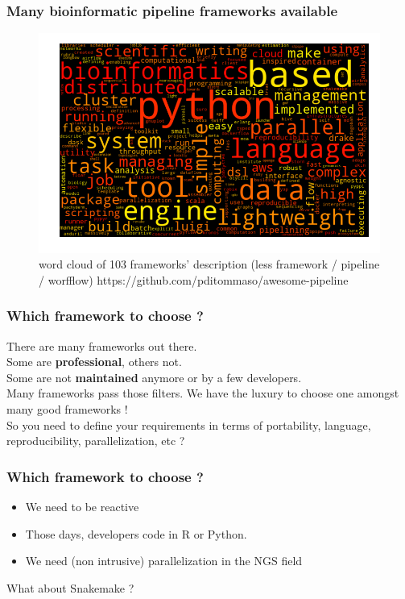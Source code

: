 \documentclass{beamer}
\begin{document}
\begin{frame}
\frametitle{Many bioinformatic pipeline frameworks available}
\centering
 \begin{figure}
 \includegraphics[scale=0.4]{images/cloud.png}
 \caption{word cloud of 103 
frameworks' description (less 
framework / pipeline / worfflow) https://github.com/pditommaso/awesome-pipeline}
 \end{figure}
 \end{frame}


\begin{frame}
 \frametitle{Which framework to choose ?}
 
 There are many frameworks out there. \\
 \vspace{.5cm}
 \pause 
 Some are \textbf{professional}, others not. \\
 \vspace{.5cm}
 \pause 
 Some are not \textbf{maintained} anymore or by a few developers. \\
 \vspace{.5cm}
 \pause 
 Many frameworks pass those filters. We have the luxury to 
choose one amongst many good frameworks !
 \\
 \vspace{.5cm}
 So you need to define your 
requirements in terms of portability, language, reproducibility, 
parallelization, etc ? 
\end{frame}
 
 
 \begin{frame}
  \frametitle{Which framework to choose ?}
  \begin{itemize}
   \item We need to be reactive
   \item Those days, developers code in R or Python. 
   \item We need (non intrusive) parallelization in the NGS field
  \end{itemize}
  
\begin{alertblock}{}
 What about Snakemake ?
\end{alertblock}
  
  
 \end{frame}
\end{document}
